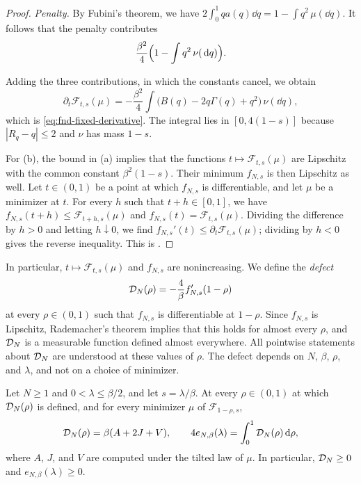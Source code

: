 \begin{proof}
\emph{Penalty.} By Fubini's theorem, we have
$2\int_0^1qa(q)\dd q=1-\int q^2\,\mu(\dd q)$. It follows that the
penalty contributes
\[
 \frac{\beta^2}4\Bigl(1-\int q^2\,\nu(\,\mathrm d q)\Bigr).
\]

Adding the three contributions, in which the constants cancel, we
obtain
\[
 \partial_t\mathcal F_{t,s}(\mu)
 =-\frac{\beta^2}4\int\bigl(B(q)-2q\Gamma(q)+q^2\bigr)\,\nu(\dd q),
\]
which is \eqref{eq:fnd-fixed-derivative}. The integral lies in
$[0,4(1-s)]$ because $|R_q-q|\le2$ and $\nu$ has mass $1-s$.

For (b), the bound in (a) implies that the functions
$t\mapsto\mathcal F_{t,s}(\mu)$ are Lipschitz with the common constant
$\beta^2(1-s)$. Their minimum $f_{N,s}$ is then Lipschitz as well. Let
$t\in(0,1)$ be a point at which $f_{N,s}$ is differentiable, and let
$\mu$ be a minimizer at $t$. For every $h$ such that $t+h\in[0,1]$, we have
$f_{N,s}(t+h)\le\mathcal F_{t+h,s}(\mu)$ and
$f_{N,s}(t)=\mathcal F_{t,s}(\mu)$. Dividing the difference by $h>0$
and letting $h\downarrow0$, we find
$f_{N,s}'(t)\le\partial_t\mathcal F_{t,s}(\mu)$; dividing by $h<0$
gives the reverse inequality. This is \cite[(2.20)]{AL}.
\end{proof}

In particular, $t\mapsto\mathcal F_{t,s}(\mu)$ and $f_{N,s}$ are
nonincreasing. We define the \emph{defect}
\[
 \mathcal D_N(\rho)=-\frac4\beta f_{N,s}'(1-\rho)
\]
at every $\rho\in(0,1)$ such that $f_{N,s}$ is differentiable at
$1-\rho$. Since $f_{N,s}$ is Lipschitz, Rademacher's theorem implies that this
holds for almost every $\rho$, and $\mathcal D_N$ is a measurable function
defined almost everywhere. All pointwise statements about $\mathcal D_N$ are
understood at these values of $\rho$. The defect depends on $N$,
$\beta$, $\rho$, and $\lambda$, and not on a choice of minimizer.

\begin{corollary}\label{cor:fnd-defect}
Let $N\ge1$ and $0<\lambda\le\beta/2$, and let $s=\lambda/\beta$. At
every $\rho\in(0,1)$ at which $\mathcal D_N(\rho)$ is defined, and for every
minimizer $\mu$ of $\mathcal F_{1-\rho,s}$,
\begin{equation}\label{eq:in-envelope}
 \mathcal D_N(\rho)=\beta(A+2J+V),\qquad
 4e_{N,\beta}(\lambda)=\int_0^1\mathcal D_N(\rho)\,\mathrm d\rho ,
\end{equation}
where $A$, $J$, and $V$ are computed under the tilted law of $\mu$. In
particular, $\mathcal D_N\ge0$ and $e_{N,\beta}(\lambda)\ge0$.
\end{corollary}

